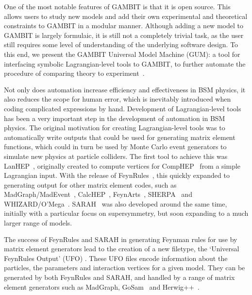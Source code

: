 \documentclass[pdftex,twocolumn,epjc3_preprint,runningheads]{svjour3}
\renewcommand{\_}{\discretionary{\underscore}{}{\underscore}}
\newcommand{\gambit}{\textsf{GAMBIT}\xspace}
\newcommand{\GB}{\gambit}
\newcommand{\gum}{\textsf{GUM}\xspace}
\newcommand{\fr}{\textsf{FeynRules}\xspace}
\newcommand{\sarah}{\textsf{SARAH}\xspace}
\newcommand{\CH}{\textsf{CalcHEP}\xspace}
\newcommand{\MG}{\textsf{MadGraph}\xspace}
\newcommand{\ufo}{\textsf{UFO}\xspace}
\begin{document}
One of the most notable features of \GB is that it is open source. This allows users to study new models and add their own experimental and theoretical constraints to \GB in a modular manner. Although adding a new model to \GB is largely formulaic, it is still not a completely trivial task, as the user still requires some level of understanding of the underlying software design. To this end, we present the \GB Universal Model Machine (\gum): a tool for interfacing symbolic Lagrangian-level tools to \GB, to further automate the procedure of comparing theory to experiment~\cite{Gonzalo:2021cnq}.

Not only does automation increase efficiency and effectiveness in BSM physics, it also reduces the scope for human error, which is inevitably introduced when coding complicated expressions by hand. Development of Lagrangian-level tools has been a very important step in the development of automation in BSM physics.  The original motivation for creating Lagrangian-level tools was to automatically write outputs that could be used for generating matrix element functions, which could in turn be used by Monte Carlo event generators to simulate new physics at particle colliders. The first tool to achieve this was \textsf{LanHEP}~\cite{Semenov:1996es,Semenov:1998eb,Semenov:2002jw,Semenov:2008jy}, originally created to compute vertices for \textsf{CompHEP}~\cite{Boos:1994xb,Pukhov:1999gg,Boos:2004kh} from a simple Lagrangian input. With the release of \fr~\cite{Christensen:2008py,Christensen:2009jx,Christensen:2010wz,Alloul:2013bka}, this quickly expanded to generating output for other matrix element codes, such as \textsf{MadGraph/MadEvent}~\cite{Stelzer:1994ta,Maltoni:2002qb,Alwall:2007st,Alwall:2011uj,Alwall:2014hca}, \CH~\cite{Pukhov:2004ca,Belyaev:2012qa}, \textsf{FeynArts}~\cite{Hahn:1998yk,Hahn:2000kx,Hahn:2000jm,Hahn:2001rv}, \textsf{SHERPA}~\cite{Gleisberg:2008ta} and \textsf{WHIZARD/O'Mega}~\cite{Kilian:2007gr,Moretti:2001zz}. \sarah~\cite{Staub:2008uz,Staub:2009bi,Staub:2010jh,Staub:2012pb,Staub:2013tta,Staub:2015kfa} was also developed around the same time, initially with a particular focus on supersymmetry, but soon expanding to a much larger range of models.

The success of \fr and \sarah in generating Feynman rules for use by matrix element generators lead to the creation of a new filetype, the `Universal FeynRules Output' (\ufo) \cite{Degrande:2011ua}. These \ufo files encode information about the particles, the parameters and interaction vertices for a given model. They can be generated by both \fr and \sarah, and handled by a range of matrix element generators such as \MG, \textsf{GoSam}~\cite{Cullen:2011ac,Cullen:2014yla} and \textsf{Herwig++}~\cite{Bahr:2008pv,Bellm:2015jjp}.
\end{document}
